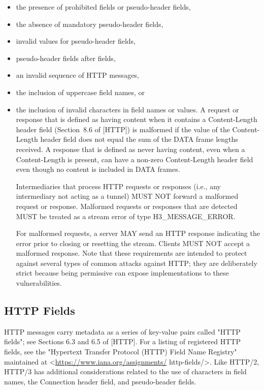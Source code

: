 \documentclass{article}
\begin{document}
\begin{itemize}
\item the presence of prohibited fields or pseudo-header fields,
\item the absence of mandatory pseudo-header fields,
\item invalid values for pseudo-header fields,
\item pseudo-header fields after fields,
\item an invalid sequence of HTTP messages,
\item the inclusion of uppercase field names, or
\item the inclusion of invalid characters in field names or values.
A request or response that is defined as having content when it contains a Content-Length header field (Section~8.6 of [HTTP]) is malformed if the value of the Content-Length header field does not equal the sum of the DATA frame lengths received.  A response that is defined as never having content, even when a Content-Length is present, can have a non-zero Content-Length header field even though no content is included in DATA frames.

Intermediaries that process HTTP requests or responses (i.e., any intermediary not acting as a tunnel) MUST NOT forward a malformed request or response.  Malformed requests or responses that are detected MUST be treated as a stream error of type H3\_MESSAGE\_ERROR.

For malformed requests, a server MAY send an HTTP response indicating the error prior to closing or resetting the stream.  Clients MUST NOT accept a malformed response.  Note that these requirements are intended to protect against several types of common attacks against HTTP; they are deliberately strict because being permissive can expose implementations to these vulnerabilities.

\end{itemize}
\subsection{HTTP Fields}

HTTP messages carry metadata as a series of key-value pairs called "HTTP fields"; see Sections 6.3 and 6.5 of [HTTP].  For a listing of registered HTTP fields, see the "Hypertext Transfer Protocol (HTTP) Field Name Registry" maintained at <\url{https://www.iana.org/assignments/} http-fields/>.  Like HTTP/2, HTTP/3 has additional considerations related to the use of characters in field names, the Connection header field, and pseudo-header fields.
\end{document}
